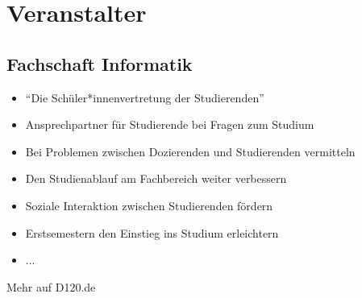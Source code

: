 

\usepackage{listings}
\usepackage{tikz}



\subtitle{Organisatorisches}
\maketitle

\section{Veranstalter}
\subsection*{Fachschaft Informatik}
\begin{frame}
	\slidehead
	\begin{itemize}
		\item "`Die Schüler*innenvertretung der Studierenden"'
		\item Ansprechpartner für Studierende bei Fragen zum Studium
		\item Bei Problemen zwischen Dozierenden und Studierenden vermitteln
		\item Den Studienablauf am Fachbereich weiter verbessern
		\item Soziale Interaktion zwischen Studierenden fördern
		\item Erstsemestern den Einstieg ins Studium erleichtern
		\item ...
	\end{itemize}
\centering
\vspace{3mm}
\huge Mehr auf D120.de
\end{frame}


